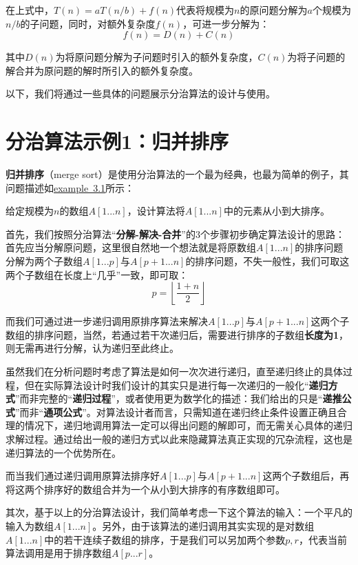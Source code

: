 \documentclass[12pt,a4paper,violet,oneside]{bbe}
\begin{document}
在上式中，$T(n)=aT(n/b)+f(n)$代表将规模为$n$的原问题分解为$a$个规模为$n/b$的子问题，同时，对额外复杂度$f(n)$，可进一步分解为：
$$
f(n)=D(n)+C(n)
$$

其中$D(n)$为将原问题分解为子问题时引入的额外复杂度，$C(n)$为将子问题的解合并为原问题的解时所引入的额外复杂度。

以下，我们将通过一些具体的问题展示分治算法的设计与使用。
\section{分治算法示例1：归并排序}
\textbf{归并排序}（merge sort）是使用分治算法的一个最为经典，也最为简单的例子，其问题描述如\hyperref[ex3.1]{example~3.1}所示：

\begin{example}\label{ex3.1}
	给定规模为$n$的数组$A[1...n]$，设计算法将$A[1...n]$中的元素从小到大排序。
\end{example}

首先，我们按照分治算法“\textbf{分解-解决-合并}”的3个步骤初步确定算法设计的思路：首先应当分解原问题，这里很自然地一个想法就是将原数组$A[1...n]$的排序问题分解为两个子数组$A[1...p]$与$A[p+1...n]$的排序问题，不失一般性，我们可取这两个子数组在长度上“几乎”一致，即可取：
$$
p=\left\lfloor\frac{1+n}{2}\right\rfloor
$$

而我们可通过进一步递归调用原排序算法来解决$A[1...p]$与$A[p+1...n]$这两个子数组的排序问题，当然，若通过若干次递归后，需要进行排序的子数组\textbf{长度为1}，则无需再进行分解，认为递归至此终止。

\begin{remark}
	虽然我们在分析问题时考虑了算法是如何一次次进行递归，直至递归终止的具体过程，但在实际算法设计时我们设计的其实只是进行每一次递归的一般化“\textbf{递归方式}”而非完整的“\textbf{递归过程}”，或者使用更为数学化的描述：我们给出的只是“\textbf{递推公式}”而非“\textbf{通项公式}”。对算法设计者而言，只需知道在递归终止条件设置正确且合理的情况下，递归地调用算法一定可以得出问题的解即可，而无需关心具体的递归求解过程。通过给出一般的递归方式以此来隐藏算法真正实现的冗杂流程，这也是递归算法的一个优势所在。
\end{remark}

而当我们通过递归调用原算法排序好$A[1...p]$与$A[p+1...n]$这两个子数组后，再将这两个排序好的数组合并为一个从小到大排序的有序数组即可。

其次，基于以上的分治算法设计，我们简单考虑一下这个算法的输入：一个平凡的输入为数组$A[1...n]$。另外，由于该算法的递归调用其实实现的是对数组$A[1...n]$中的若干连续子数组的排序，于是我们可以另加两个参数$p,r$，代表当前算法调用是用于排序数组$A[p...r]$。
\end{document}
